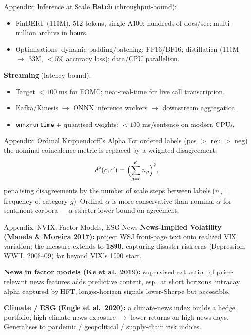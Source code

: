 \documentclass[9pt,t]{beamer}
\begin{document}
\begin{frame}[noframenumbering]{Appendix: Inference at Scale}
\textbf{Batch} (throughput-bound):
\begin{itemize}\footnotesize
  \item FinBERT (110M), 512 tokens, single A100: hundreds of docs/sec;
        multi-million archive in hours.
  \item Optimisations: dynamic padding/batching; FP16/BF16; distillation
        (110M $\to$ 33M, $<5\%$ accuracy loss); data/CPU parallelism.
\end{itemize}

\textbf{Streaming} (latency-bound):
\begin{itemize}\footnotesize
  \item Target $<100$ ms for FOMC; near-real-time for live call transcription.
  \item Kafka/Kinesis $\to$ ONNX inference workers $\to$ downstream aggregation.
  \item \texttt{onnxruntime} + quantised weights: $<100$ ms/sentence on modern CPUs.
\end{itemize}
\end{frame}

\begin{frame}[noframenumbering]{Appendix: Ordinal Krippendorff's Alpha}
For ordered labels (pos $>$ neu $>$ neg) the nominal coincidence metric is
replaced by a weighted disagreement:
\[
d^2(c,c') = \Bigl(\sum_{g=c}^{c'} n_g\Bigr)^2,
\]
penalising disagreements by the number of scale steps between labels
($n_g$ = frequency of category $g$). Ordinal $\alpha$ is more conservative than
nominal $\alpha$ for sentiment corpora --- a stricter lower bound on agreement.
\end{frame}

\begin{frame}[noframenumbering]{Appendix: NVIX, Factor Models, ESG News}
\textbf{News-Implied Volatility (Manela \& Moreira 2017):} project WSJ
front-page text onto realized VIX variation; the measure extends to \textbf{1890},
capturing disaster-risk eras (Depression, WWII, 2008--09) far beyond VIX's 1990 start.

\medskip
\textbf{News in factor models (Ke et al.\ 2019):} supervised extraction of
price-relevant news features adds predictive content, esp.\ at short horizons;
intraday alpha captured by HFT, longer-horizon signals lower-Sharpe but accessible.

\medskip
\textbf{Climate / ESG (Engle et al.\ 2020):} a climate-news index builds a hedge
portfolio; high climate-news exposure $\to$ lower returns on high-news days.
Generalises to pandemic / geopolitical / supply-chain risk indices.
\end{frame}
\end{document}
